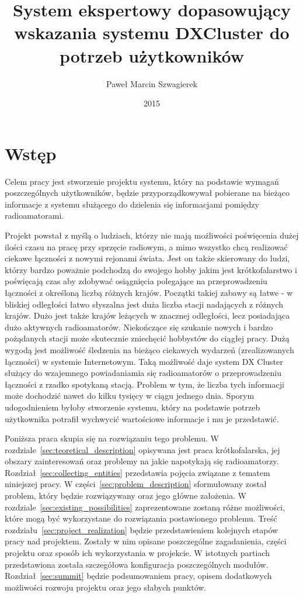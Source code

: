 \documentclass[]{mgr}
\title{System ekspertowy dopasowujący wskazania systemu DXCluster do potrzeb użytkowników}
\author{Paweł Marcin Szwagierek}
\date{2015}
\begin{document}
    
    \maketitle

    \tableofcontents

    \chapter{Wstęp}
    Celem pracy jest stworzenie projektu systemu, który na podstawie wymagań poszczególnych użytkowników, będzie przyporządkowywał pobierane na bieżąco informacje z systemu służącego do dzielenia się informacjami pomiędzy radioamatorami.

    Projekt powstał z myślą o ludziach, którzy nie mają możliwości poświęcenia dużej ilości czasu na pracę przy sprzęcie radiowym, a mimo wszystko chcą realizować ciekawe łączności z nowymi rejonami świata. Jest on także skierowany do ludzi, którzy bardzo poważnie podchodzą do swojego hobby jakim jest krótkofalarstwo i poświęcają czas aby zdobywać osiągnięcia polegające na przeprowadzeniu łączności z określoną liczbą różnych krajów. Początki takiej zabawy są łatwe - w bliskiej odległości łatwo słyszalna jest duża liczba stacji nadających z różnych krajów. Dużo jest także krajów leżących w znacznej odległości, lecz posiadająca dużo aktywnych radioamatorów. Niekończące się szukanie nowych i bardzo pożądanych stacji może skutecznie zniechęcić hobbystów do ciągłej pracy. Dużą wygodą jest możliwość śledzenia na bieżąco ciekawych wydarzeń (zrealizowanych łączności) w systemie Internetowym. Taką możliwość daje system DX Cluster służący do wzajemnego powiadaniamia się radioamatorów o przeprowadzeniu łączności z rzadko spotykaną stacją. Problem w tym, że liczba tych informacji może dochodzić nawet do kilku tysięcy w ciągu jednego dnia. Sporym udogodnieniem byłoby stworzenie systemu, który na podstawie potrzeb użytkownika potrafił wychwycić wartościowe informacje i mu je przedstawić.

    Poniższa praca skupia się na rozwiązaniu tego problemu. W rozdziale~\ref{sec:teoretical_description} opisywana jest praca krótkofalarska, jej obszary zainteresowań oraz problemy na jakie napotykają się radioamatorzy. Rozdział~\ref{sec:collecting_entities} przedstawia pojęcia związane z tematem niniejszej pracy. W części~\ref{sec:problem_description} sformułowany został problem, który będzie rozwiązywany oraz jego główne założenia. W rozdziale~\ref{sec:existing_possibilities} zaprezentowane zostaną różne możliwości, które mogą być wykorzystane do rozwiązania postawionego problemu. Treść rozdziału~\ref{sec:project_realization} będzie przedstawieniem kolejnych etapów pracy nad projektem. Zostały w nim opisane poszczególne zagadanienia, części projektu oraz sposób ich wykorzystania w projekcie. W istotnych partiach przedstawiona została szczegółowa konfiguracja poszczególnych modułów. Rozdział~\ref{sec:summit} będzie podsumowaniem pracy, opisem dodatkowych możliwości rozwoju projektu oraz jego słabych punktów.
\end{document}
